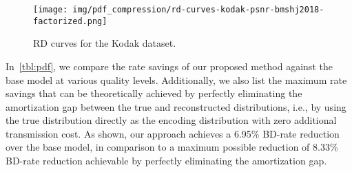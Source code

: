 \begin{figure}[htbp]
  \centering
  \texttt{[image: img/pdf\_compression/rd-curves-kodak-psnr-bmshj2018-factorized.png]}
  \caption[RD curves for Kodak dataset]{%
    RD curves for the Kodak dataset.%
  }
  \label{fig:pdf/rd-curves}
\end{figure}


In~\cref{tbl:pdf}, we compare the rate savings of our proposed method against the base model at various quality levels.
Additionally, we also list the maximum rate savings that can be theoretically achieved by perfectly eliminating the amortization gap between the true and reconstructed distributions, i.e., by using the true distribution directly as the encoding distribution with zero additional transmission cost.
As shown, our approach achieves a 6.95\% BD-rate reduction over the base model, in comparison to a maximum possible reduction of 8.33\% BD-rate reduction achievable by perfectly eliminating the amortization gap.


%


